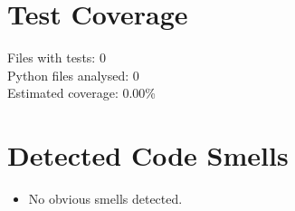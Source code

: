 \documentclass{article}
\begin{document}
\section*{Test Coverage}
Files with tests: 0 \\
Python files analysed: 0 \\
Estimated coverage: 0.00\%

\section*{Detected Code Smells}
\begin{itemize}[leftmargin=*]
    \item No obvious smells detected.
\end{itemize}
\end{document}
